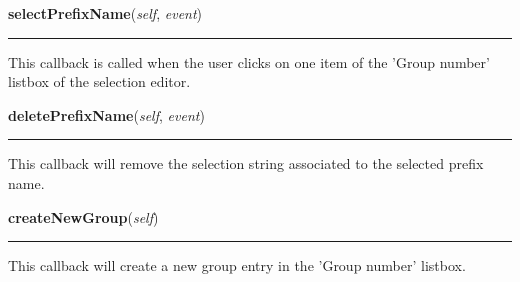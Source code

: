     \vspace{0.5ex}

\hspace{.8\funcindent}\begin{boxedminipage}{\funcwidth}

    \raggedright \textbf{selectPrefixName}(\textit{self}, \textit{event})

    \vspace{-1.5ex}

    \rule{\textwidth}{0.5\fboxrule}
\setlength{\parskip}{2ex}
    This callback is called when the user clicks on one item of the 'Group 
    number' listbox of the selection editor.

\setlength{\parskip}{1ex}
    \end{boxedminipage}

    \label{nMOLDYN:GUI:SelectionDialog:SelectionDialog:deletePrefixName}

    \vspace{0.5ex}

\hspace{.8\funcindent}\begin{boxedminipage}{\funcwidth}

    \raggedright \textbf{deletePrefixName}(\textit{self}, \textit{event})

    \vspace{-1.5ex}

    \rule{\textwidth}{0.5\fboxrule}
\setlength{\parskip}{2ex}
    This callback will remove the selection string associated to the 
    selected prefix name.

\setlength{\parskip}{1ex}
    \end{boxedminipage}

    \label{nMOLDYN:GUI:SelectionDialog:SelectionDialog:createNewGroup}

    \vspace{0.5ex}

\hspace{.8\funcindent}\begin{boxedminipage}{\funcwidth}

    \raggedright \textbf{createNewGroup}(\textit{self})

    \vspace{-1.5ex}

    \rule{\textwidth}{0.5\fboxrule}
\setlength{\parskip}{2ex}
    This callback will create a new group entry in the 'Group number' 
    listbox.

\setlength{\parskip}{1ex}
    \end{boxedminipage}

